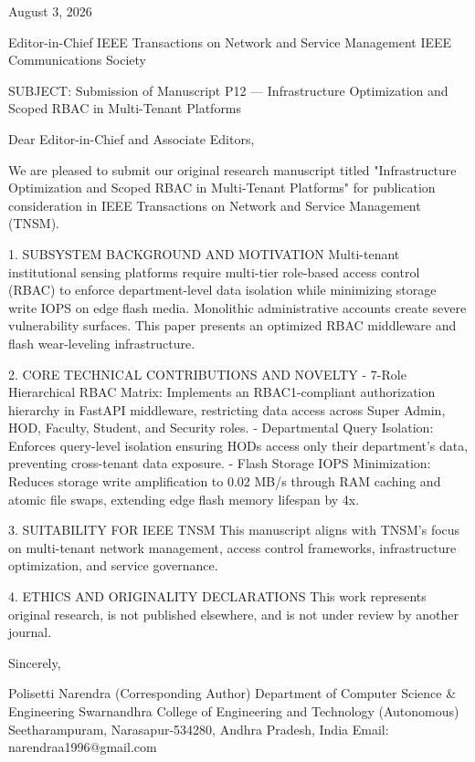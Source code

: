 August 3, 2026

Editor-in-Chief
IEEE Transactions on Network and Service Management
IEEE Communications Society

SUBJECT: Submission of Manuscript P12 — Infrastructure Optimization and Scoped RBAC in Multi-Tenant Platforms

Dear Editor-in-Chief and Associate Editors,

We are pleased to submit our original research manuscript titled "Infrastructure Optimization and Scoped RBAC in Multi-Tenant Platforms" for publication consideration in IEEE Transactions on Network and Service Management (TNSM).

1. SUBSYSTEM BACKGROUND AND MOTIVATION
Multi-tenant institutional sensing platforms require multi-tier role-based access control (RBAC) to enforce department-level data isolation while minimizing storage write IOPS on edge flash media. Monolithic administrative accounts create severe vulnerability surfaces. This paper presents an optimized RBAC middleware and flash wear-leveling infrastructure.

2. CORE TECHNICAL CONTRIBUTIONS AND NOVELTY
  - 7-Role Hierarchical RBAC Matrix: Implements an RBAC1-compliant authorization hierarchy in FastAPI middleware, restricting data access across Super Admin, HOD, Faculty, Student, and Security roles.
  - Departmental Query Isolation: Enforces query-level isolation ensuring HODs access only their department's data, preventing cross-tenant data exposure.
  - Flash Storage IOPS Minimization: Reduces storage write amplification to 0.02 MB/s through RAM caching and atomic file swaps, extending edge flash memory lifespan by 4x.

3. SUITABILITY FOR IEEE TNSM
This manuscript aligns with TNSM's focus on multi-tenant network management, access control frameworks, infrastructure optimization, and service governance.

4. ETHICS AND ORIGINALITY DECLARATIONS
This work represents original research, is not published elsewhere, and is not under review by another journal.

Sincerely,

Polisetti Narendra (Corresponding Author)
Department of Computer Science & Engineering
Swarnandhra College of Engineering and Technology (Autonomous)
Seetharampuram, Narasapur-534280, Andhra Pradesh, India
Email: narendraa1996@gmail.com
